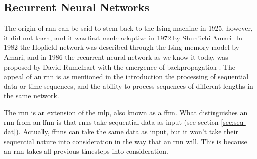 \documentclass[12pt]{article}
\begin{document}
\subsection{Recurrent Neural Networks}  \label{sec:rnn}
The origin of \gls{rnn} can be said to stem back to the Ising machine in 1925, however, it did not learn, and it was first made adaptive in 1972 by Shun'ichi Amari. In 1982 the Hopfield network was described through the Ising memory model by Amari, and in 1986 the recurrent neural network as we know it today was proposed by David Rumelhart with the emergence of backpropagation \cite{rumelhart_learning_1986}. The appeal of an \gls{rnn} is as mentioned in the introduction the processing of sequential data or time sequences, and the ability to process sequences of different lengths in the same network. 

The \gls{rnn} is an extension of the \gls{mlp}, also known as a \gls{ffnn}. 
What distinguishes an \gls{rnn} from an \gls{ffnn} is that \gls{rnn}s take sequential data as input (see section \cref{sec:seq-dat}). \cite{schmidtRecurrentNeuralNetworks2019} Actually, \gls{ffnn}s can take the same data as input, but it won't take their sequential nature into consideration in the way that an \gls{rnn} will. This is because an \gls{rnn} takes all previous timesteps into consideration.
\end{document}
